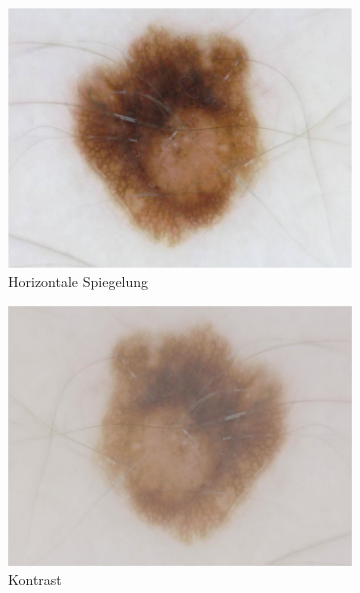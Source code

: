 \begin{figure}[t]
\begin{subfigure}[t]{0.24\linewidth}
		\includegraphics[width=\textwidth]{pics/augmentations/horizontal_flip.png}
		\caption{Horizontale Spiegelung}
		\label{subfig:aug_h_flip}
	\end{subfigure}
	\begin{subfigure}[t]{0.24\linewidth}
		\includegraphics[width=\textwidth]{pics/augmentations/contrast.png}
		\caption{Kontrast}
		\label{subfig:aug_contrast}
	\end{subfigure}
	\begin{subfigure}[t]{0.24\linewidth}

\end{subfigure}
\end{figure}
